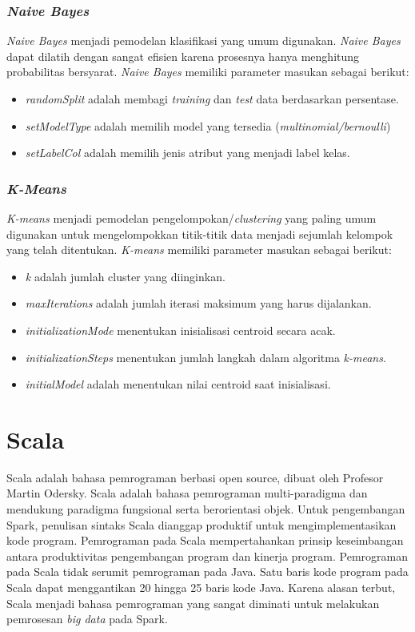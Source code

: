 \subsubsection{\textit{Naive Bayes}}
\label{sec:naivebayes_mllib}
\textit{Naive Bayes} menjadi pemodelan klasifikasi yang umum digunakan. \textit{Naive Bayes} dapat dilatih dengan sangat efisien karena prosesnya hanya menghitung probabilitas bersyarat. \textit{Naive Bayes} memiliki parameter masukan sebagai berikut:
 
\begin{itemize}
\item \textit{randomSplit} adalah membagi \textit{training} dan \textit{test} data berdasarkan persentase.
\item \textit{setModelType} adalah memilih model yang tersedia (\textit{multinomial/bernoulli})
\item \textit{setLabelCol} adalah memilih jenis atribut yang menjadi label kelas.
\end{itemize}

\subsubsection{\textit{K-Means}}
\label{sec:kmeans_mllib}
\textit{K-means} menjadi pemodelan pengelompokan/\textit{clustering} yang paling umum digunakan untuk mengelompokkan titik-titik data menjadi sejumlah kelompok yang telah ditentukan. \textit{K-means} memiliki parameter masukan sebagai berikut:

\begin{itemize}
\item \textit{k} adalah jumlah cluster yang diinginkan. 
\item \textit{maxIterations} adalah jumlah iterasi maksimum yang harus dijalankan.
\item \textit{initializationMode} menentukan inisialisasi centroid secara acak.
\item \textit{initializationSteps} menentukan jumlah langkah dalam algoritma \textit{k-means}.
\item \textit{initialModel} adalah menentukan nilai centroid saat inisialisasi.
\end{itemize}

\section{Scala}
\label{sec:scala}
Scala adalah bahasa pemrograman berbasi open source, dibuat oleh Profesor Martin Odersky. Scala adalah bahasa pemrograman multi-paradigma dan mendukung paradigma fungsional serta berorientasi objek. Untuk pengembangan Spark, penulisan sintaks Scala dianggap produktif untuk mengimplementasikan kode program. Pemrograman pada Scala mempertahankan prinsip keseimbangan antara produktivitas pengembangan program dan kinerja program. Pemrograman pada Scala tidak serumit pemrograman pada Java. Satu baris kode program pada Scala dapat menggantikan 20 hingga 25 baris kode Java. Karena alasan terbut, Scala menjadi bahasa pemrograman yang sangat diminati untuk melakukan pemrosesan \textit{big data} pada Spark.

